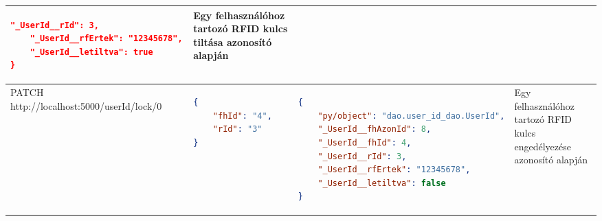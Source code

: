 \documentclass[11pt, a4paper]{article}
\begin{document}
\begin{minipage}{\linewidth}
\begin{tabular}{|m{20em} | m{12em} | m{23em} | m{10em}|}
\begin{lstlisting}[language=json]
	"_UserId__rId": 3,
	"_UserId__rfErtek": "12345678",
	"_UserId__letiltva": true
}
		\end{lstlisting}
		& Egy felhasználóhoz tartozó RFID kulcs tiltása azonosító alapján \\
		\hline
		PATCH \newline{} http://localhost:5000/userId/lock/0 &
\fontsize{6}{2}\selectfont \begin{lstlisting}[language=json]
{
	"fhId": "4",
	"rId": "3"
}
\end{lstlisting}
&
\fontsize{6}{2}\selectfont \begin{lstlisting}[language=json]
{
	"py/object": "dao.user_id_dao.UserId",
	"_UserId__fhAzonId": 8,
	"_UserId__fhId": 4,
	"_UserId__rId": 3,
	"_UserId__rfErtek": "12345678",
	"_UserId__letiltva": false
}
\end{lstlisting}
& Egy felhasználóhoz tartozó RFID kulcs engedélyezése azonosító alapján \\
\hline
	\end{tabular}
	\label{table:7}
\end{minipage}
\end{document}
